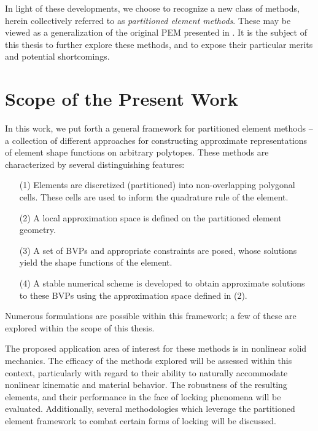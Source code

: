 	In light of these developments, we choose to recognize a new class of methods, herein collectively referred to as \textit{partitioned element methods}. These may be viewed as a generalization of the original PEM presented in \cite{Rashid:12}. It is the subject of this thesis to further explore these methods, and to expose their particular merits and potential shortcomings.

\section{Scope of the Present Work}

	In this work, we put forth a general framework for partitioned element methods -- a collection of different approaches for constructing approximate representations of element shape functions on arbitrary polytopes. These methods are characterized by several distinguishing features:
	\begin{itemize}
		\item[(1)] Elements are discretized (partitioned) into non-overlapping polygonal cells. These cells are used to inform the quadrature rule of the element.
		\item[(2)] A local approximation space is defined on the partitioned element geometry.
		\item[(3)] A set of BVPs and appropriate constraints are posed, whose solutions yield the shape functions of the element.
		\item[(4)] A stable numerical scheme is developed to obtain approximate solutions to these BVPs using the approximation space defined in (2).
	\end{itemize}
	Numerous formulations are possible within this framework; a few of these are explored within the scope of this thesis.
	
	 The proposed application area of interest for these methods is in nonlinear solid mechanics. The efficacy of the methods explored will be assessed within this context, particularly with regard to their ability to naturally accommodate nonlinear kinematic and material behavior. The robustness of the resulting elements, and their performance in the face of locking phenomena will be evaluated. Additionally, several methodologies which leverage the partitioned element framework to combat certain forms of locking will be discussed.

